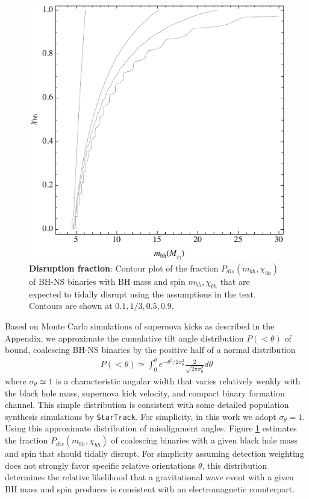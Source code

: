 \documentclass[nofootinbib,twocolumn,prd]{emulateapj}
\begin{document}
\begin{figure}
\includegraphics{Figures/fig-mma-PrecomputeDisrupt}
\caption{\label{fig:TidalDisrupt:Probability}\textbf{Disruption fraction}: Contour plot of the fraction
  $P_{dis}(m_{bh},\chi_{bh})$ of BH-NS binaries with BH mass and spin $m_{bh},\chi_{bh}$ that are expected to tidally
  disrupt using the assumptions in the text.  Contours are shown at $0.1, 1/3, 0.5, 0.9$.}
\end{figure}

Based on Monte Carlo simulations of supernova kicks as described in the Appendix, we approximate the
cumulative tilt angle distribution $P(<\theta)$ of bound,
coalescing BH-NS binaries by the positive half of a normal distribution
\begin{eqnarray}
P(<\theta)\simeq \int_0^\theta e^{-\theta^2/2\sigma_\theta^2} \frac{2}{\sqrt{2\pi \sigma_\theta^2}} d\theta
\end{eqnarray}
where $\sigma_{\theta}\simeq 1$ is a characteristic angular width that varies relatively weakly with the black hole mass,
 supernova kick velocity, and compact binary formation channel.  This simple distribution is consistent with some detailed population synthesis simulations by
\texttt{StarTrack}.
For simplicity, in this work we adopt $\sigma_{\theta}=1$.   
Using this approximate distribution of misalignment angles, Figure \ref{fig:TidalDisrupt:Probability} estimates the fraction
$P_{dis}(m_{bh},\chi_{bh})$ of coalescing binaries with a given black hole mass and spin that should tidally disrupt.  
For simplicity assuming detection weighting does not strongly favor specific relative orientations $\theta$, this
distribution determines the relative likelihood that a gravitational wave event with a given BH mass and spin produces
is consistent with an electromagnetic counterpart.
\end{document}
